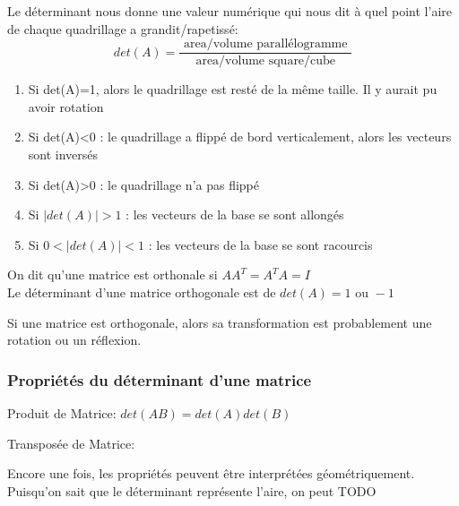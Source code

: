 \documentclass{article}
\begin{document}
\begin{intuition}
    Le déterminant nous donne une valeur numérique qui nous dit
    à quel point l'aire de chaque quadrillage a grandit/rapetissé:
    $$ det(A) = \frac{\text { area/volume parallélogramme }}
    { \text{ area/volume square/cube } }  $$
    \begin{enumerate}
	\item Si det(A)=1, alors le quadrillage est resté de la même taille.
	    Il y aurait pu avoir rotation
	\item Si det(A)<0 : le quadrillage a flippé de bord verticalement,
	    alors les vecteurs sont inversés
	\item Si det(A)>0 : le quadrillage n'a pas flippé
	\item Si $ |det(A)| > 1$ : les vecteurs de la base se sont allongés
	\item Si $ 0< |det(A)| < 1$ : les vecteurs de la base se sont
	    racourcis
    \end{enumerate}
\end{intuition}

\begin{definition}
    On dit qu'une matrice est orthonale si $ A A^T = A^T A = I$\\
    Le déterminant d'une matrice orthogonale est de $ det(A) = 1 \text{ ou } -1 $
\end{definition}

\begin{intuition}
    Si une matrice est orthogonale, alors sa transformation est probablement
    une rotation ou un réflexion.
\end{intuition}

\subsubsection{Propriétés du déterminant d'une matrice}%
\label{ssub:Propriétés du déterminant d'une matrice}

\begin{theorem}
\item Produit de Matrice: $ det(AB) = det(A) det(B) $
\item Transposée de Matrice:
\end{theorem}

\begin{remark}
    Encore une fois, les propriétés peuvent être interprétées géométriquement.
    Puisqu'on sait que le déterminant représente l'aire, on peut TODO
\end{remark}
\end{document}
